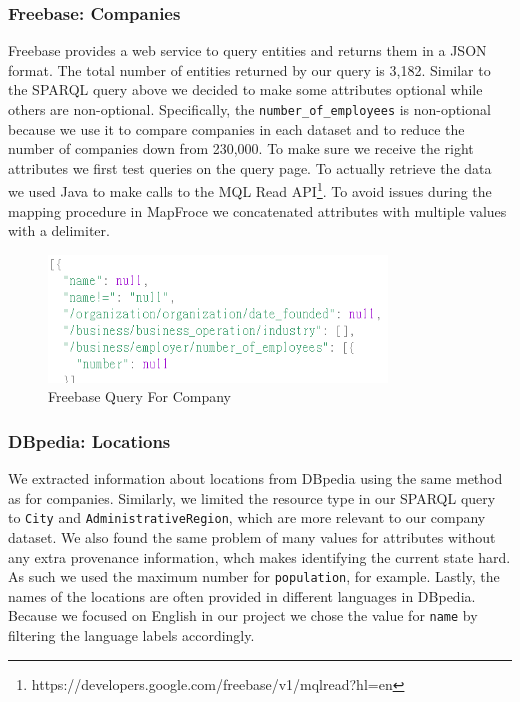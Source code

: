 \subsubsection{Freebase: Companies}
Freebase provides a web service to query entities and returns them in a JSON format. The total number of entities returned by our query is 3,182. Similar to the SPARQL query above we decided to make some attributes optional while others are non-optional. Specifically, the \texttt{number\_of\_employees} is non-optional because we use it to compare companies in each dataset and to reduce the number of companies down from 230,000. To make sure we receive the right attributes we first test queries on the query page. To actually retrieve the data we used Java to make calls to the MQL Read API\footnote{https://developers.google.com/freebase/v1/mqlread?hl=en}. To avoid issues during the mapping procedure in MapFroce we concatenated attributes with multiple values with a delimiter. 

\begin{figure}[H]
	\begin{center}
	\includegraphics[width=9cm]{Freebase_query}
	\caption[Freebase Query For Company]{Freebase Query For Company}
	\label{fig:db}
	\end{center}
\end{figure}

\subsubsection{DBpedia: Locations}
We extracted information about locations from DBpedia using the same method as for companies. Similarly, we limited the resource type in our SPARQL query to \texttt{City} and \texttt{AdministrativeRegion}, which are more relevant to our company dataset. We also found the same problem of many values for attributes without any extra provenance information, whch makes identifying the current state hard. As such we used the maximum number for \texttt{population}, for example. Lastly, the names of the locations are often provided in different languages in DBpedia. Because we focused on English in our project we chose the value for \texttt{name} by filtering the language labels accordingly. 

















